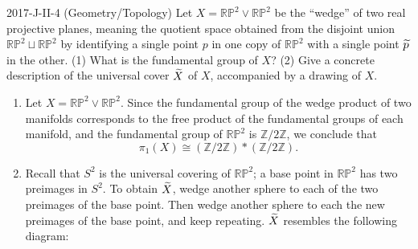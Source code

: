 \documentclass{article}
\begin{document}
\begin{prb}{2017-J-II-4 (Geometry/Topology)}
	Let $X = \mathbb{RP}^{2} \vee \mathbb{RP}^{2}$ be the ``wedge'' of two real projective planes, meaning the quotient space obtained from the disjoint union $\mathbb{RP}^{2} \sqcup \mathbb{RP}^{2}$ by identifying a single point $p$ in one copy of $\mathbb{RP}^{2}$ with a single point $\widetilde{p}$ in the other. (1) What is the fundamental group of $X$? (2) Give a concrete description of the universal cover $\widetilde{X}$ of $X$, accompanied by a drawing of $X$. 
\end{prb}
\begin{solutions}
	\vspace{-0.35cm}
	\begin{enumerate}[itemsep =-2pt,label = (\arabic{*})]
		\item Let $X = \mathbb{RP}^{2} \vee \mathbb{RP}^{2}$. Since the fundamental group of the wedge product of two manifolds corresponds to the free product of the fundamental groups of each manifold, and the fundamental group of $\mathbb{RP}^{2}$ is $\mathbb{Z}/2\mathbb{Z}$, we conclude that 
			\begin{equation}
				\pi_{1}(X) \cong (\mathbb{Z}/2\mathbb{Z}) \ast (\mathbb{Z}/2\mathbb{Z}). 
			\end{equation}
		\item Recall that $S^{2}$ is the universal covering of $\mathbb{RP}^{2}$; a base point in $\mathbb{RP}^{2}$ has two preimages in $S^{2}$. To obtain $\widetilde{X}$, wedge another sphere to each of the two preimages of the base point. Then wedge another sphere to each the new preimages of the base point, and keep repeating. $\widetilde{X}$ resembles the following diagram: 
	\end{enumerate}
	\begin{center}
	\end{center}
\end{solutions}
\end{document}
